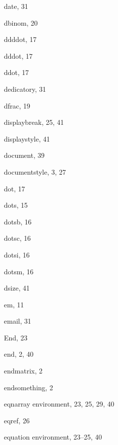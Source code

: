 \begin{theindex}
  \indexspace

  \item {\ptt \bslash date}, 31
  \item {\ptt \bslash dbinom}, 20
  \item {\ptt \bslash ddddot}, 17
  \item {\ptt \bslash dddot}, 17
  \item {\ptt \bslash ddot}, 17
  \item {\ptt \bslash dedicatory}, 31
  \item {\ptt \bslash dfrac}, 19
  \item {\ptt \bslash displaybreak}, 25, 41
  \item {\ptt \bslash displaystyle}, 41
  \item {\ptt \bslash document}, 39
  \item {\ptt \bslash documentstyle}, 3, 27
  \item {\ptt \bslash dot}, 17
  \item {\ptt \bslash dots}, 15
  \item {\ptt \bslash dotsb}, 16
  \item {\ptt \bslash dotsc}, 16
  \item {\ptt \bslash dotsi}, 16
  \item {\ptt \bslash dotsm}, 16
  \item {\ptt \bslash dsize}, 41

  \indexspace

  \item {\ptt \bslash em}, 11
  \item {\ptt \bslash email}, 31
  \item {\ptt \bslash End}, 23
  \item {\ptt \bslash end}, 2, 40
  \item {\ptt \bslash endmatrix}, 2
  \item {\ptt \bslash endsomething}, 2
  \item {\ptt {}eqnarray} environment, 23, 25, 29, 40
  \item {\ptt \bslash eqref}, 26
  \item {\ptt {}equation} environment, 23--25, 40

  \indexspace


\end{theindex}
